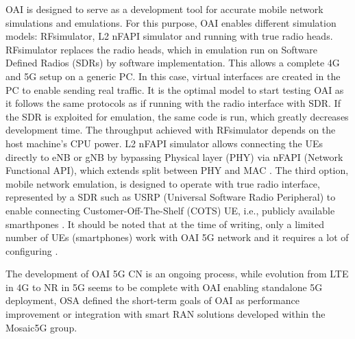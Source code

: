 \documentclass[12pt,a4paper,twoside]{report}
\begin{document}
%
OAI is designed to serve as a development tool for accurate mobile network simulations and emulations. For this purpose, OAI enables different simulation models: RFsimulator, L2 nFAPI simulator and running with true radio heads. RFsimulator replaces the radio heads, which in emulation run on Software Defined Radios (SDRs) by software implementation. This allows a complete 4G and 5G setup on a generic PC. In this case, virtual interfaces are created in the PC to enable sending real traffic. It is the optimal model to start testing OAI as it follows the same protocols as if running with the radio interface with SDR. If the SDR is exploited for emulation, the same code is run, which greatly decreases development time. The throughput achieved with RFsimulator depends on the host machine’s CPU power. L2 nFAPI simulator allows connecting the UEs directly to eNB or gNB by bypassing Physical layer (PHY) via nFAPI (Network Functional API), which extends split between PHY and MAC \cite{scf-nfapi}. The third option, mobile network emulation, is designed to operate with true radio interface, represented by a SDR such as USRP (Universal Software Radio Peripheral) to enable connecting Customer-Off-The-Shelf (COTS) UE, i.e., publicly available smarthpones \cite{oai_doc}. It should be noted that at the time of writing, only a limited number of UEs (smartphones) work with OAI 5G network and it requires a lot of configuring \cite{oai-maillist}.

The development of OAI 5G CN is an ongoing process, while evolution from LTE in 4G to NR in 5G seems to be complete with OAI enabling standalone 5G deployment, OSA defined the short-term goals of OAI as performance improvement or integration with smart RAN solutions developed within the Mosaic5G group. \cite{oai-mosaic5g-web}
%
\end{document}
